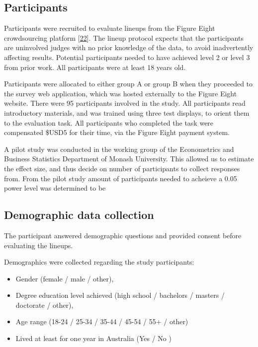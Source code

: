 \documentclass[conference,final,]{IEEEtran}
\providecommand{\tightlist}{%
  \setlength{\itemsep}{0pt}\setlength{\parskip}{0pt}}
\begin{document}
\hypertarget{participants}{%
\subsection{Participants}\label{participants}}

Participants were recruited to evaluate lineups from the Figure Eight crowdsourcing platform {[}\protect\hyperlink{ref-figeight}{22}{]}.
The lineup protocol expects that the participants are uninvolved judges with no prior knowledge of the data, to avoid inadvertently affecting results. Potential participants needed to have achieved level 2 or level 3 from prior work. All participants were at least 18 years old.

Participants were allocated to either group A or group B when they proceeded to the survey web application, which was hosted externally to the Figure Eight website. There were 95 participants involved in the study. All participants read introductory materials, and was trained using three test displays, to orient them to the evaluation task. All participants who completed the task were compensated \$USD5 for their time, via the Figure Eight payment system.

A pilot study was conducted in the working group of the Econometrics and Business Statistics Department of Monash University. This allowed us to estimate the effect size, and thus decide on number of participants to collect responses from. From the pilot study amount of participants needed to acheieve a 0.05 power level was determined to be

\hypertarget{demographic-data-collection}{%
\subsection{Demographic data collection}\label{demographic-data-collection}}

The participant answered demographic questions and provided consent before evaluating the lineups.

Demographics were collected regarding the study participants:

\begin{itemize}
\tightlist
\item
  Gender (female / male / other),
\item
  Degree education level achieved (high school / bachelors / masters / doctorate / other),
\item
  Age range (18-24 / 25-34 / 35-44 / 45-54 / 55+ / other)
\item
  Lived at least for one year in Australia (Yes / No )
\end{itemize}
\end{document}

